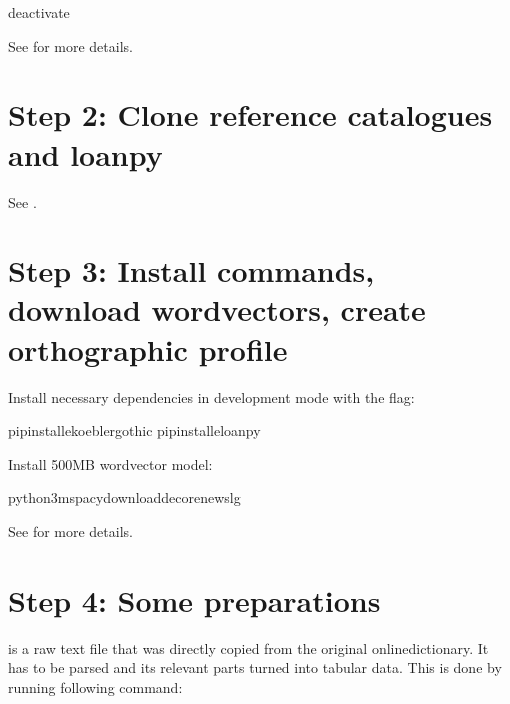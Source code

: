 \documentclass[letterpaper,10pt,english]{sphinxmanual}
\begin{document}
\begin{sphinxVerbatim}[commandchars=\\\{\}]
deactivate
\end{sphinxVerbatim}

\sphinxAtStartPar
See 
for more details.


\section{Step 2: Clone reference catalogues and loanpy}
\label{\detokenize{mkcldf:step-2-clone-reference-catalogues-and-loanpy}}
\sphinxAtStartPar
See .


\section{Step 3: Install commands, download wordvectors, create orthographic profile}
\label{\detokenize{mkcldf:step-3-install-commands-download-wordvectors-create-orthographic-profile}}
\sphinxAtStartPar
Install necessary dependencies in development mode with the  flag:

\begin{sphinxVerbatim}[commandchars=\\\{\}]
pipinstall\PYGZhy{}ekoeblergothic
pipinstall\PYGZhy{}eloanpy
\end{sphinxVerbatim}

\sphinxAtStartPar
Install 500MB word\sphinxhyphen{}vector model:

\begin{sphinxVerbatim}[commandchars=\\\{\}]
python3\PYGZhy{}mspacydownloadde\PYGZus{}core\PYGZus{}news\PYGZus{}lg
\end{sphinxVerbatim}

\sphinxAtStartPar
See 
for more details.


\section{Step 4: Some preparations}
\label{\detokenize{mkcldf:step-4-some-preparations}}
\sphinxAtStartPar
{} is a raw text file that was directly copied from the
original online\sphinxhyphen{}dictionary. It has to be parsed and its relevant parts turned
into tabular data. This is done by running following command:
\end{document}
